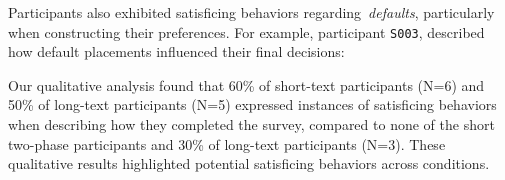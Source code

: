 Participants also exhibited satisficing behaviors regarding~\textit{defaults}, particularly when constructing their preferences. For example, participant \texttt{S003}, described how default placements influenced their final decisions:


Our qualitative analysis found that 60\% of short-text participants (N=6) and 50\% of long-text participants (N=5) expressed instances of satisficing behaviors when describing how they completed the survey, compared to none of the short two-phase participants and 30\% of long-text participants (N=3). These qualitative results highlighted potential satisficing behaviors across conditions.
